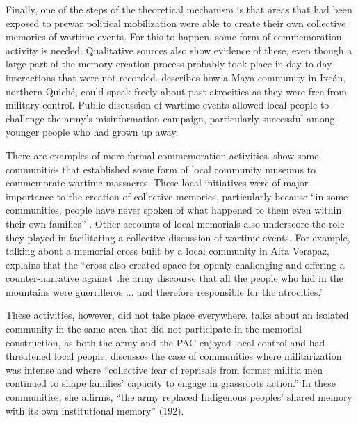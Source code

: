 \documentclass[12pt, notitlepage]{article}
\begin{document}

Finally, one of the steps of the theoretical mechanism is that areas that had been exposed to prewar political mobilization were able to create their own collective memories of wartime events.
For this to happen, some form of commemoration activity is needed.
Qualitative sources also show evidence of these, even though a large part of the memory creation process probably took place in day-to-day interactions that were not recorded.
\citet{Falla:2006vu} describes how a Maya community in Ixcán, northern Quiché, could speak freely about past atrocities as they were free from military control.
Public discussion of wartime events allowed local people to challenge the army's misinformation campaign, particularly successful among younger people who had grown up away.

There are examples of more formal commemoration activities.
\citet{Arriaza:2008wf} show some communities that established some form of local community museums to commemorate wartime massacres.
These local initiatives were of major importance to the creation of collective memories, particularly because ``in some communities, people have never spoken of what happened to them even within their own families'' \citep[161]{Arriaza:2008wf}.
Other accounts of local memorials also underscore the role they played in facilitating a collective discussion of wartime events.
For example, talking about a memorial cross built by a local community in Alta Verapaz, \citet[170--171]{Viaene:2011td} explains that the ``cross also created space for openly challenging and offering a counter-narrative against the army discourse that all the people who hid in the mountains were guerrilleros ... and therefore responsible for the atrocities.''

These activities, however, did not take place everywhere.
\citet{Viaene:2011td} talks about an isolated community in the same area that did not participate in the memorial construction, as both the army and the PAC enjoyed local control and had threatened local people.
\citet[178]{Esparza:2018uw} discusses the case of communities where militarization was intense and where ``collective fear of reprisals from former militia men continued to shape families' capacity to engage in grassroots action.'' In these communities, she affirms, ``the army replaced Indigenous peoples' shared memory with its own institutional memory'' (192).
\end{document}

